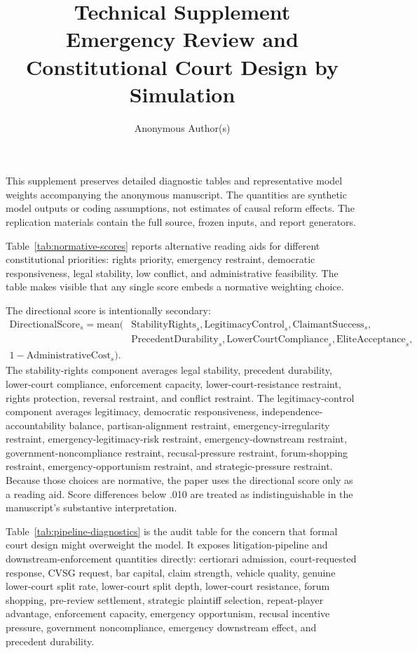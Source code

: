 \documentclass[11pt]{article}
\title{Technical Supplement\\Emergency Review and Constitutional Court Design by Simulation}
\author{Anonymous Author(s)}
\date{}
\begin{document}
\maketitle

This supplement preserves detailed diagnostic tables and representative model weights accompanying the anonymous manuscript. The quantities are synthetic model outputs or coding assumptions, not estimates of causal reform effects. The replication materials contain the full source, frozen inputs, and report generators.

Table~\ref{tab:normative-scores} reports alternative reading aids for different constitutional priorities: rights priority, emergency restraint, democratic responsiveness, legal stability, low conflict, and administrative feasibility. The table makes visible that any single score embeds a normative weighting choice.


The directional score is intentionally secondary:
\[
\begin{aligned}
\mathrm{DirectionalScore}_s = \mathrm{mean}(&\mathrm{StabilityRights}_s,
\mathrm{LegitimacyControl}_s,\mathrm{ClaimantSuccess}_s,\\
&\mathrm{PrecedentDurability}_s,\mathrm{LowerCourtCompliance}_s,
\mathrm{EliteAcceptance}_s,\\
1-\mathrm{AdministrativeCost}_s).
\end{aligned}
\]
The stability-rights component averages legal stability, precedent durability, lower-court compliance, enforcement capacity, lower-court-resistance restraint, rights protection, reversal restraint, and conflict restraint. The legitimacy-control component averages legitimacy, democratic responsiveness, independence-accountability balance, partisan-alignment restraint, emergency-irregularity restraint, emergency-legitimacy-risk restraint, emergency-downstream restraint, government-noncompliance restraint, recusal-pressure restraint, forum-shopping restraint, emergency-opportunism restraint, and strategic-pressure restraint. Because those choices are normative, the paper uses the directional score only as a reading aid. Score differences below .010 are treated as indistinguishable in the manuscript's substantive interpretation.

\clearpage
\begin{landscape}
\setlength{\textwidth}{\linewidth}
Table~\ref{tab:pipeline-diagnostics} is the audit table for the concern that formal court design might overweight the model. It exposes litigation-pipeline and downstream-enforcement quantities directly: certiorari admission, court-requested response, CVSG request, bar capital, claim strength, vehicle quality, genuine lower-court split rate, lower-court split depth, lower-court resistance, forum shopping, pre-review settlement, strategic plaintiff selection, repeat-player advantage, enforcement capacity, emergency opportunism, recusal incentive pressure, government noncompliance, emergency downstream effect, and precedent durability.

\end{landscape}
\end{document}
